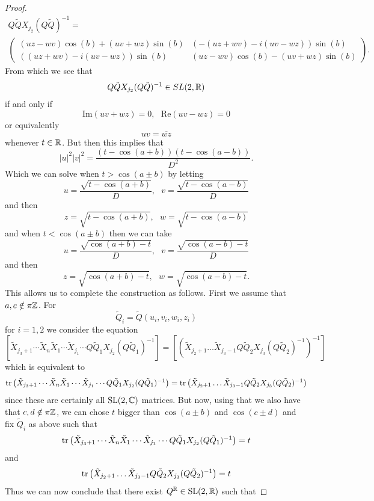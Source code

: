 \begin{proof}
\begin{multline}
Q\tilde Q X_{j_2}(Q\tilde Q)^{-1}=
\\ \begin{pmatrix} (uz-wv)\cos(b) + (uv+wz) \sin(b) & 
(-(uz+wv) - i(uv-wz))\sin(b)
\\ ((uz+wv) - i(uv-wz))\sin(b) &
(uz-wv)\cos(b) - (uv+wz) \sin(b) \end{pmatrix}.
\end{multline}
From which we see that 
$$Q\tilde QX_{j_2}(Q\tilde Q)^{-1}\in SL(2,\mathbb{R})$$ 
if and only if
$$ \text{Im}(uv+wz) = 0, \ \ \ \text{Re}(uv-wz) =0$$
or equivalently
$$ uv = \overline{wz}$$
whenever $t\in \mathbb{R}$. But then this implies that
$$ |u|^2 |v|^2 = \frac{(t-\cos(a+b))(t-\cos(a-b))}{D^2}.$$
Which we can solve when $t> \cos(a\pm b)$ by letting
$$ u= \frac{\sqrt{t-\cos(a+b)}}{D}, \ \ \ v= \frac{\sqrt{t-\cos(a-b)}}{D}$$
and then
$$ z = \sqrt{t-\cos(a+b)}, \ \ \ w= \sqrt{t-\cos(a-b)}$$
and when $t< \cos(a\pm b)$ then we can take
$$ u= \frac{\sqrt{\cos(a+b) - t }}{D}, \ \ \ v= \frac{\sqrt{\cos(a-b)-t}}{D}$$
and then
$$ z = \sqrt{\cos(a+b)-t}, \ \ \ w= \sqrt{\cos(a-b)-t}.$$
This allows us to complete the construction as follows. First we assume that  $a, c\notin \pi \mathbb{Z}$. For 
$$ \tilde Q_i = \tilde Q(u_i,v_i,w_i,z_i)$$
for $i=1,2$ we consider the equation
$$
\left[\tilde X_{{j_3}+1}\cdots \tilde X_n  \tilde X_1\cdots \tilde X_{j_1} \cdots Q \tilde Q_1X_{j_2}(Q \tilde Q_1)^{-1}\right]  =
\left[\left(\tilde X_{j_2+1} \ldots \tilde X_{j_3-1} Q \tilde Q_2 X_{j_3}(Q \tilde Q_2)^{-1}\right)^{-1}\right]
$$
which is equivalent to 
$$\operatorname{tr}\left(\tilde X_{{j_3}+1}\cdots \tilde X_n  \tilde X_1\cdots \tilde X_{j_1} \cdots Q \tilde Q_1X_{j_2}(Q \tilde Q_1)^{-1}\right) =
\operatorname{tr}\left(\tilde X_{j_2+1} \ldots \tilde X_{j_3-1} Q \tilde Q_2 X_{j_3}(Q \tilde Q_2)^{-1}\right)$$
since these are certainly all $\operatorname{SL}(2,\mathbb{C})$ matrices.
But now, using that we also have that $c,d \notin \pi\mathbb{Z}$, we can chose $t$ bigger than $\cos(a \pm b)$ and $\cos(c\pm d)$ and fix $\tilde Q_i$ as above such that
\begin{equation}\label{tra1}
 \operatorname{tr}\left(\tilde X_{{j_3}+1}\cdots \tilde X_n  \tilde X_1\cdots \tilde X_{j_1} \cdots Q \tilde Q_1X_{j_2}(Q \tilde Q_1)^{-1}\right)  = t
 \end{equation}
and 
\begin{equation}\label{tra2}
 \operatorname{tr}\left(\tilde X_{j_2+1} \ldots \tilde X_{j_3-1} Q \tilde Q_2 X_{j_3}(Q \tilde Q_2)^{-1}\right) = t
 \end{equation}
Thus we can now conclude that there exist $Q^{\mathbb{R}} \in \operatorname{SL}(2,\mathbb{R})$ such that

\end{proof}
